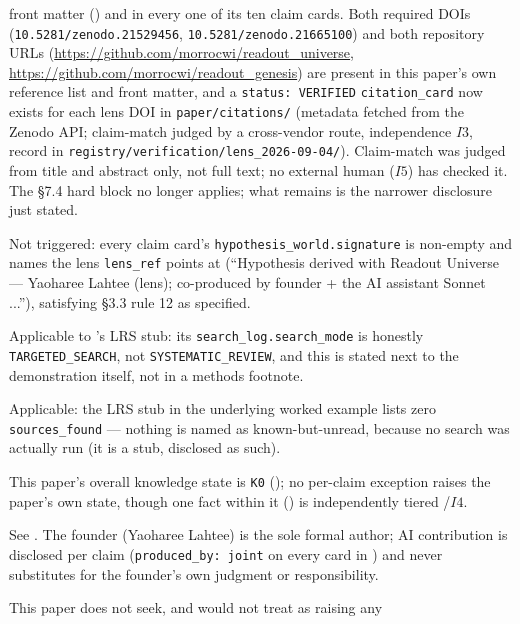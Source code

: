 \begin{disclaimers}
    front matter () and in every one of its ten claim cards. Both required
    DOIs (\texttt{10.5281/zenodo.21529456}, \texttt{10.5281/zenodo.21665100}) and both repository
    URLs (\url{https://github.com/morrocwi/readout_universe},
    \url{https://github.com/morrocwi/readout_genesis}) are present in this paper's own reference
    list and front matter, and a \texttt{status: VERIFIED} \texttt{citation\_card} now exists for
    each lens DOI in \texttt{paper/citations/} (metadata fetched from the Zenodo API; claim-match
    judged by a cross-vendor route, independence \(I3\), record in
    \texttt{registry/verification/lens\_2026-09-04/}). Claim-match was judged from title and
    abstract only, not full text; no external human (\(I5\)) has checked it. The \S7.4 hard block
    no longer applies; what remains is the narrower disclosure just stated.
  \item[D-LENS-UNSIGNED] Not triggered: every claim card's \texttt{hypothesis\_world.signature} is
    non-empty and names the lens \texttt{lens\_ref} points at (``Hypothesis derived with Readout
    Universe --- Yaoharee Lahtee (lens); co-produced by founder + the AI assistant Sonnet ...''), satisfying
    \S3.3 rule 12 as specified.
  \item[D-LIT-MODE] Applicable to 's LRS stub: its
    \texttt{search\_log.search\_mode} is honestly \texttt{TARGETED\_SEARCH}, not
    \texttt{SYSTEMATIC\_REVIEW}, and this is stated next to the demonstration itself, not in a
    methods footnote.
  \item[D-LIT-NOT-OBTAINED] Applicable: the LRS stub in the underlying worked example lists zero
    \texttt{sources\_found} — nothing is named as known-but-unread, because no search was actually
    run (it is a stub, disclosed as such).
  \item[D-K-STATE] This paper's overall knowledge state is \texttt{K0} (); no
    per-claim exception raises the paper's own state, though one fact within it
    () is independently tiered \FiniteDiag{}/$I4$.
  \item[D-AUTHORSHIP] See . The founder (Yaoharee Lahtee) is the sole
    formal author; AI contribution is disclosed per claim (\texttt{produced\_by: joint} on every
    card in ) and never substitutes for the founder's own judgment or
    responsibility.
  \item[D-NO-VERTICAL-AUTHORITY] This paper does not seek, and would not treat as raising any

\end{disclaimers}
